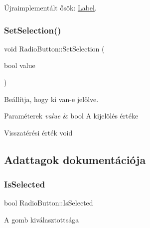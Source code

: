 Újraimplementált ősök\+: \hyperlink{class_label_a918ebb45dbaa5484643355cf5ab4be47}{Label}.

\mbox{\label{class_radio_button_a23ff4c296d56f8254b8bcb9afe4f5ee9}} 
\subsubsection{\texorpdfstring{Set\+Selection()}{SetSelection()}}
{\footnotesize\ttfamily void Radio\+Button\+::\+Set\+Selection (\begin{DoxyParamCaption}\item[{bool}]{value }\end{DoxyParamCaption})}



Beállítja, hogy ki van-\/e jelölve. 


\begin{DoxyParams}{Paraméterek}
{\em value} & bool A kijelölés értéke \\
\hline
\end{DoxyParams}
\begin{DoxyReturn}{Visszatérési érték}
void 
\end{DoxyReturn}


\subsection{Adattagok dokumentációja}
\mbox{\label{class_radio_button_aa3ecd38f7d2f5a9b21d1b0ce9f36ecb0}} 
\subsubsection{\texorpdfstring{Is\+Selected}{IsSelected}}
{\footnotesize\ttfamily bool Radio\+Button\+::\+Is\+Selected\hspace{0.3cm}{\ttfamily [private]}}

A gomb kiválasztottsága \mbox{\label{class_radio_button_a944ef6b993774e3c36523915a2bb70bd}} 

